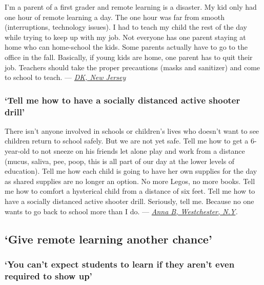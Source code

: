 I'm a parent of a first grader and remote learning is a disaster. My kid
only had one hour of remote learning a day. The one hour was far from
smooth (interruptions, technology issues). I had to teach my child the
rest of the day while trying to keep up with my job. Not everyone has
one parent staying at home who can home-school the kids. Some parents
actually have to go to the office in the fall. Basically, if young kids
are home, one parent has to quit their job. Teachers should take the
proper precautions (masks and sanitizer) and come to school to teach.
--- \href{https://nyti.ms/2BeuqLJ\#permid=108205646}{\emph{DK, New
Jersey}}

\hypertarget{tell-me-how-to-have-a-socially-distanced-active-shooter-drill}{%
\subsubsection{\texorpdfstring{\textbf{`Tell me how to have a socially
distanced active shooter
drill'}}{`Tell me how to have a socially distanced active shooter drill'}}\label{tell-me-how-to-have-a-socially-distanced-active-shooter-drill}}

There isn't anyone involved in schools or children's lives who doesn't
want to see children return to school safely. But we are not yet safe.
Tell me how to get a 6-year-old to not sneeze on his friends let alone
play and work from a distance (mucus, saliva, pee, poop, this is all
part of our day at the lower levels of education). Tell me how each
child is going to have her own supplies for the day as shared supplies
are no longer an option. No more Legos, no more books. Tell me how to
comfort a hysterical child from a distance of six feet. Tell me how to
have a socially distanced active shooter drill. Seriously, tell me.
Because no one wants to go back to school more than I do. ---
\href{https://nyti.ms/2W8RrH7\#permid=108084485}{\emph{Anna B,
Westchester, N.Y}}\emph{.}

\hypertarget{give-remote-learning-another-chance}{%
\subsection{`Give remote learning another
chance'}\label{give-remote-learning-another-chance}}

\hypertarget{you-cant-expect-students-to-learn-if-they-arent-even-required-to-show-up}{%
\subsubsection{`You can't expect students to learn if they aren't even
required to show
up'}\label{you-cant-expect-students-to-learn-if-they-arent-even-required-to-show-up}}

